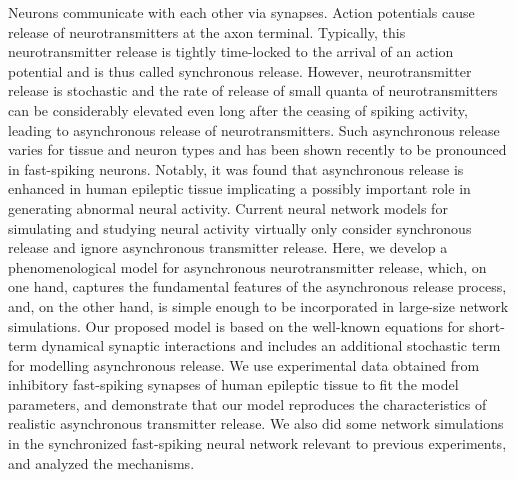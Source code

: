
\begin{eabstract} 
Neurons communicate with each other via synapses.  Action
potentials cause release of neurotransmitters at the axon
terminal. Typically, this neurotransmitter release is tightly time-locked to
the arrival of an action potential and is thus called synchronous
release. However, neurotransmitter release is stochastic and the
rate of release of small quanta of neurotransmitters can be
considerably elevated even long after the ceasing of spiking
activity, leading to asynchronous release of neurotransmitters. 
Such asynchronous release varies for tissue and neuron
types and has been shown recently to be pronounced in fast-spiking
neurons.  Notably, it was found that asynchronous release is
enhanced in human epileptic tissue implicating a possibly important
role in generating abnormal neural activity. Current neural
network models for simulating and studying neural activity virtually only
consider synchronous release and ignore asynchronous transmitter
release.  Here, we develop a phenomenological model for asynchronous
neurotransmitter release, which, on one hand, captures the
fundamental features of the asynchronous release process, and, on
the other hand, is simple enough to be incorporated in large-size
network simulations.  Our proposed model is based on the well-known
equations for short-term dynamical synaptic interactions and
includes an additional stochastic term for modelling asynchronous
release. We use experimental data obtained from inhibitory
fast-spiking synapses of human epileptic tissue to fit the model
parameters, and demonstrate that our model reproduces the
characteristics of realistic asynchronous transmitter release. 
We also did some network simulations in the synchronized fast-spiking neural network relevant to previous experiments, and analyzed the mechanisms.
\end{eabstract}

